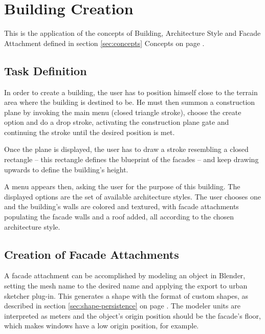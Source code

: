 
\section{Building Creation}

This is the application of the concepts of Building, Architecture Style and
Facade Attachment defined in section \ref{sec:concepts} Concepts on page \pageref{sec:concepts}.

\subsection{Task Definition}

In order to create a building, the user has to position himself close to the terrain area
where the building is destined to be.
He must then summon a construction plane by invoking the main menu (closed triangle stroke),
choose the create option and do a drop stroke, activating the construction plane gate and
continuing the stroke until the desired position is met.


Once the plane is displayed, the user has to draw a stroke resembling a closed rectangle
-- this rectangle defines the blueprint of the facades --
and keep drawing upwards to define the building's height.

A menu appears then, asking the user for the purpose of this building.
The displayed options are the set of available architecture styles.
The user chooses one and the building's walls are colored and textured,
with facade attachments populating the facade walls and a roof added,
all according to the chosen architecture style.


\subsection{Creation of Facade Attachments}

A facade attachment can be accomplished by modeling an object in Blender,
setting the mesh name to the desired name and applying the export to urban sketcher plug-in.
This generates a shape with the format of custom shapes, as described in section \ref{sec:shape-persistence}
on page \pageref{sec:shape-persistence}.
The modeler units are interpreted as meters and the object's origin position should be the facade's floor,
which makes windows have a low origin position, for example.




